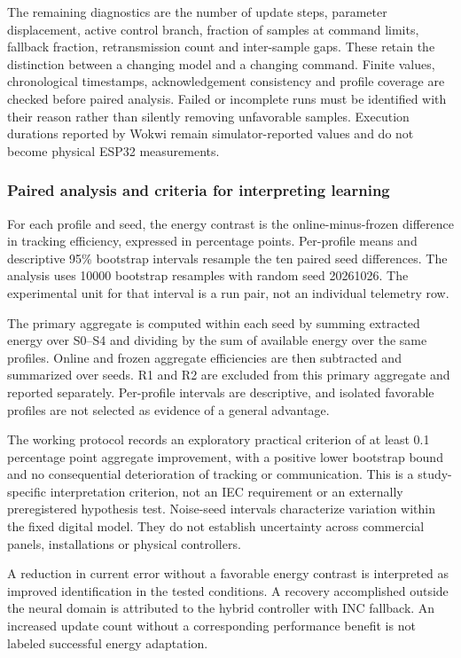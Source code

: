 \documentclass[Acad.Energy.,researcharticle,9pt,twoside,oneauthor]{Definitions/jams_academia}
\begin{document}
The remaining diagnostics are the number of update steps, parameter displacement, active control branch, fraction of samples at command limits, fallback fraction, retransmission count and inter-sample gaps. These retain the distinction between a changing model and a changing command. Finite values, chronological timestamps, acknowledgement consistency and profile coverage are checked before paired analysis. Failed or incomplete runs must be identified with their reason rather than silently removing unfavorable samples. Execution durations reported by Wokwi remain simulator-reported values and do not become physical ESP32 measurements.

\subsubsection{Paired analysis and criteria for interpreting learning}
For each profile and seed, the energy contrast is the online-minus-frozen difference in tracking efficiency, expressed in percentage points. Per-profile means and descriptive 95\% bootstrap intervals resample the ten paired seed differences. The analysis uses 10000 bootstrap resamples with random seed 20261026. The experimental unit for that interval is a run pair, not an individual telemetry row.

The primary aggregate is computed within each seed by summing extracted energy over S0--S4 and dividing by the sum of available energy over the same profiles. Online and frozen aggregate efficiencies are then subtracted and summarized over seeds. R1 and R2 are excluded from this primary aggregate and reported separately. Per-profile intervals are descriptive, and isolated favorable profiles are not selected as evidence of a general advantage.

The working protocol records an exploratory practical criterion of at least 0.1 percentage point aggregate improvement, with a positive lower bootstrap bound and no consequential deterioration of tracking or communication. This is a study-specific interpretation criterion, not an IEC requirement or an externally preregistered hypothesis test. Noise-seed intervals characterize variation within the fixed digital model. They do not establish uncertainty across commercial panels, installations or physical controllers.

A reduction in current error without a favorable energy contrast is interpreted as improved identification in the tested conditions. A recovery accomplished outside the neural domain is attributed to the hybrid controller with INC fallback. An increased update count without a corresponding performance benefit is not labeled successful energy adaptation.
\end{document}
